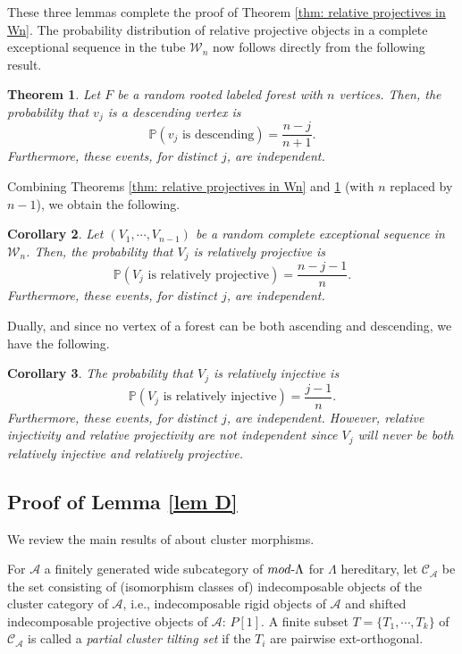 \documentclass[11pt]{amsart}
\newtheorem{thm}{Theorem}[section]
\newtheorem{cor}[thm]{Corollary}
\theoremstyle{definition}
\theoremstyle{remark}
\numberwithin{equation}{section}
\newcommand{\cA}{\ensuremath{{\mathcal{A}}}}
\newcommand{\cC}{\ensuremath{{\mathcal{C}}}}
\newcommand{\cW}{\ensuremath{{\mathcal{W}}}}
\begin{document}
These three lemmas complete the proof of Theorem \ref{thm: relative projectives in Wn}. The probability distribution of relative projective objects in a complete exceptional sequence in the tube $\cW_n$ now follows directly from the following result.

\begin{thm}\cite[Corollary 5.2]{Ig-Sen}\label{thm: probabilities for descending vertices}
Let $F$ be a random rooted labeled forest with $n$ vertices. Then, the probability that $v_j$ is a descending vertex is
\[
	\mathbb P(v_j\text{ is descending})=\frac{n-j}{n+1}.
\] 
Furthermore, these events, for distinct $j$, are independent.
\end{thm}

Combining Theorems \ref{thm: relative projectives in Wn}
and \ref{thm: probabilities for descending vertices} (with $n$ replaced by $n-1$), we obtain the following.

\begin{cor}\label{cor: second part of thm F}
Let $(V_1,\cdots,V_{n-1})$ be a random complete exceptional sequence in $\cW_n$. Then, the probability that $V_j$ is relatively projective is
\[
	\mathbb P(V_j\text{ is relatively projective})=\frac{n-j-1}{n}.
\] 
Furthermore, these events, for distinct $j$, are independent.
\end{cor}

Dually, and since no vertex of a forest can be both ascending and descending, we have the following.

\begin{cor}\label{cor: dual of second part of F}
The probability that $V_j$ is relatively injective is
\[
	\mathbb P(V_j\text{ is relatively injective})=\frac{j-1}{n}.
\] 
Furthermore, these events, for distinct $j$, are independent. However, relative injectivity and relative projectivity are not independent since $V_j$ will never be both relatively injective and relatively projective.
\end{cor}


\subsection{Proof of Lemma \ref{lem D}}\label{ss: proof of Lemma E}

We review the main results of \cite{IT13} about cluster morphisms.

For $\cA$ a finitely generated wide subcategory of $mod\text-\Lambda$ for $\Lambda$ hereditary, let $\cC_\cA$ be the set consisting of (isomorphism classes of) indecomposable objects of the cluster category of $\cA$, i.e., indecomposable rigid objects of $\cA$ and shifted indecomposable projective objects of $\cA$: $P[1]$. A finite subset $T=\{T_1,\cdots,T_k\}$ of $\cC_\cA$ is called a \emph{partial cluster tilting set} if the $T_i$ are pairwise ext-orthogonal.
\end{document}
